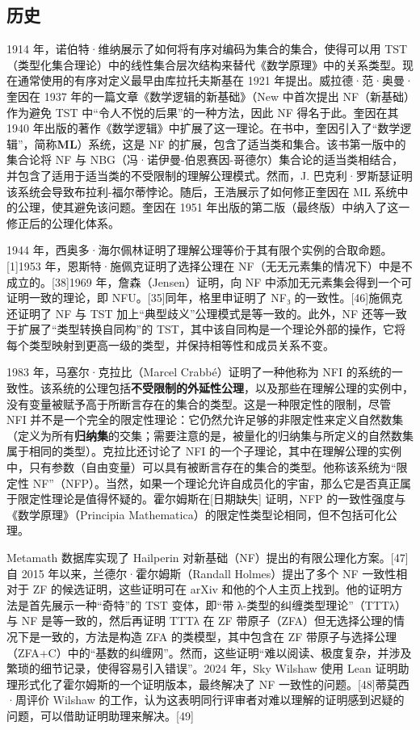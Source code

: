 \subsection{历史}  
1914 年，诺伯特·维纳展示了如何将有序对编码为集合的集合，使得可以用 TST（类型化集合理论）中的线性集合层次结构来替代《数学原理》中的关系类型。现在通常使用的有序对定义最早由库拉托夫斯基在 1921 年提出。威拉德·范·奥曼·奎因在 1937 年的一篇文章《数学逻辑的新基础》（New 中首次提出 NF（新基础）作为避免 TST 中“令人不悦的后果”的一种方法，因此 NF 得名于此。奎因在其 1940 年出版的著作《数学逻辑》中扩展了这一理论。在书中，奎因引入了“数学逻辑”，简称\textbf{ML}）系统，这是 NF 的扩展，包含了适当类和集合。该书第一版中的集合论将 NF 与 NBG（冯·诺伊曼-伯恩赛因-哥德尔）集合论的适当类相结合，并包含了适用于适当类的不受限制的理解公理模式。然而，J. 巴克利·罗斯瑟证明该系统会导致布拉利-福尔蒂悖论。随后，王浩展示了如何修正奎因在 ML 系统中的公理，使其避免该问题。奎因在 1951 年出版的第二版（最终版）中纳入了这一修正后的公理化体系。

1944 年，西奥多·海尔佩林证明了理解公理等价于其有限个实例的合取命题。[1]1953 年，恩斯特·施佩克证明了选择公理在 NF（无无元素集的情况下）中是不成立的。[38]1969 年，詹森（Jensen）证明，向 NF 中添加无元素集会得到一个可证明一致的理论，即 NFU。[35]同年，格里申证明了 NF₃ 的一致性。[46]施佩克还证明了 NF 与 TST 加上“典型歧义”公理模式是等一致的。此外，NF 还等一致于扩展了“类型转换自同构”的 TST，其中该自同构是一个理论外部的操作，它将每个类型映射到更高一级的类型，并保持相等性和成员关系不变。

1983 年，马塞尔·克拉比（Marcel Crabbé）证明了一种他称为 NFI 的系统的一致性。该系统的公理包括\textbf{不受限制的外延性公理}，以及那些在理解公理的实例中，没有变量被赋予高于所断言存在的集合的类型。这是一种限定性的限制，尽管 NFI 并不是一个完全的限定性理论：它仍然允许足够的非限定性来定义自然数集（定义为所有\textbf{归纳集}的交集；需要注意的是，被量化的归纳集与所定义的自然数集属于相同的类型）。克拉比还讨论了 NFI 的一个子理论，其中在理解公理的实例中，只有参数（自由变量）可以具有被断言存在的集合的类型。他称该系统为“限定性 NF”（NFP）。当然，如果一个理论允许自成员化的宇宙，那么它是否真正属于限定性理论是值得怀疑的。霍尔姆斯在[日期缺失] 证明，NFP 的一致性强度与《数学原理》（Principia Mathematica）的限定性类型论相同，但不包括可化公理。

Metamath 数据库实现了 Hailperin 对新基础（NF）提出的有限公理化方案。[47]自 2015 年以来，兰德尔·霍尔姆斯（Randall Holmes）提出了多个 NF 一致性相对于 ZF 的候选证明，这些证明可在 arXiv 和他的个人主页上找到。他的证明方法是首先展示一种“奇特”的 TST 变体，即“带 λ-类型的纠缠类型理论”（TTTλ）与 NF 是等一致的，然后再证明 TTTλ 在 ZF 带原子（ZFA）但无选择公理的情况下是一致的，方法是构造 ZFA 的类模型，其中包含在 ZF 带原子与选择公理（ZFA+C）中的“基数的纠缠网”。然而，这些证明“难以阅读、极度复杂，并涉及繁琐的细节记录，使得容易引入错误”。2024 年，Sky Wilshaw 使用 Lean 证明助理形式化了霍尔姆斯的一个证明版本，最终解决了 NF 一致性的问题。[48]蒂莫西·周评价 Wilshaw 的工作，认为这表明同行评审者对难以理解的证明感到迟疑的问题，可以借助证明助理来解决。[49]
